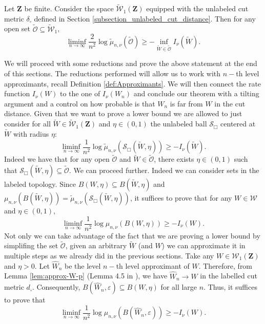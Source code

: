 \documentclass[12pt,twoside,a4paper]{article}
\newcommand{\Space}{\mathbf{Z}}
\newcommand{\Graphon}{\mathcal{W}_1}
\newcommand{\UGraphon}{\widetilde{\mathcal{W}}_1}
\begin{document}
\begin{theorem}\label{thm:lowerbound}
Let $\Space$ be finite. Consider the space $\widetilde{\mathcal{W}}_{1}(\Space)$ equipped with the unlabeled cut metric $\delta_\square$ defined in Section \ref{subsection_unlabeled_cut_distance}. Then for any open set $\widetilde{\mathcal{O}} \subseteq \widetilde{\mathcal{W}}_1$,
\[
\liminf_{n \to \infty} \frac{2}{n^2} \log \widetilde{\mu}_{n,\nu}(\widetilde{\mathcal{O}}) \geq -\inf_{\widetilde{W} \in \widetilde{\mathcal{O}}} I_\nu(\widetilde{W}).
\]
\end{theorem}
We will proceed with some reductions and prove the above statement at the end of this sections. The reductions performed will allow us to work with $n-$th level approximants, recall Definition \ref{def:Approximants}. We will then connect the rate function $I_\nu(W)$ to the one of $I_\nu(W_n)$ and conclude our theorem with a tilting argument and a control on how probable is that $W_n$ is far from $W$ in the cut distance.
Given that we want to prove a lower bound we are allowed to just consider for all $\widetilde{W} \in \UGraphon(\Space)$ and $\eta \in (0,1)$ the unlabeled ball $\mathcal{S}_{\Box}$ centered at $\widetilde{W}$ with radius $\eta$:
\[
\liminf_{n \to \infty} \frac{1}{n^2} \log \widetilde{\mu}_{n,\nu}(\mathcal{S}_{\Box}(\widetilde{W},\eta)) \geq -I_\nu(\widetilde{W}).
\]
Indeed we have that for any open $\widetilde{\mathcal{O}}$ and $\widetilde{W} \in \widetilde{\mathcal{O}}$, there exists $\eta \in (0,1)$ such that $\mathcal{S}_{\Box}(\widetilde{W},\eta) \subseteq \widetilde{\mathcal{O}}$. We can proceed further. Indeed we can consider sets in the labeled topology. Since $B(W,\eta) \subseteq B(\widetilde{W},\eta)$ and $\mu_{n,\nu}(B(\widetilde{W},\eta)) = \tilde{\mu}_{n,\nu}(\mathcal{S}_{\Box}(\widetilde{W},\eta))$, it suffices to prove that for any $W \in \mathcal{W}$ and $\eta \in (0,1)$,
\[
\liminf_{n \to \infty} \frac{1}{n^2} \log\mu_{n,\nu}(B(W,\eta)) \geq -I_\nu(W).
\]
Not only we can take advantage of the fact that we are proving a lower bound by simplifing the set $\widetilde{\mathcal{O}}$, given an arbitrary $\widetilde{W}$ (and $W$) we can approximate it in multiple steps as we already did in the previous sections. Take any $W \in \Graphon(\Space)$ and $\eta > 0$. Let $\widehat{W}_n$ be the level $n-$th level approximant of $W.$ Therefore, from Lemma \ref{lem:approx-W-p} (Lemma 4.5 in \cite{abraham2023probabilitygraphons}), we have $\widehat{W}_n \to W$ in the labelled cut metric $d_{\square}.$ Consequently, $B(\widehat{W}_n,\varepsilon) \subseteq B(W,\eta)$ for all large $n$. Thus, it suffices to prove that
\[
\liminf_{n \to \infty} \frac{1}{n^2} \log \mu_{n,\nu}(B(\widehat{W}_n,\varepsilon)) \geq -I_\nu(W).
\]
\end{document}
